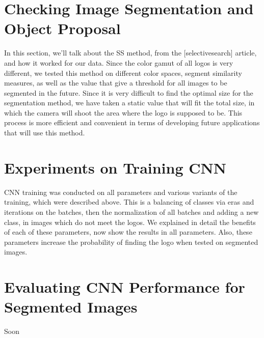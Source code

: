 \noindent 

\vspace{-0.3cm}

\section{Checking Image Segmentation and Object Proposal}\label{sec:5.3}
\vspace{-0.5cm}
\noindent In this section, we'll talk about the SS method, from the [selectivesearch] article, and how it worked for our data. Since the color gamut of all logos is very different, we tested this method on different color spaces, segment similarity measures, as well as the value that give a threshold for all images to be segmented in the future. Since it is very difficult to find the optimal size for the segmentation method, we have taken a static value that will fit the total size, in which the camera will shoot the area where the logo is supposed to be. This process is more efficient and convenient in terms of developing future applications that will use this method.

\vspace{-0.3cm}

\section{Experiments on Training CNN}\label{sec:5.4}
\vspace{-0.5cm}
\noindent CNN training was conducted on all parameters and various variants of the training, which were described above. This is a balancing of classes via eras and iterations on the batches, then the normalization of all batches and adding a new class, in images which do not meet the logos. We explained in detail the benefits of each of these parameters, now show the results in all parameters. Also, these parameters increase the probability of finding the logo when tested on segmented images.

\vspace{-0.3cm}

\section{Evaluating CNN Performance for Segmented Images}\label{sec:5.5}
\vspace{-0.5cm}
\noindent Soon

